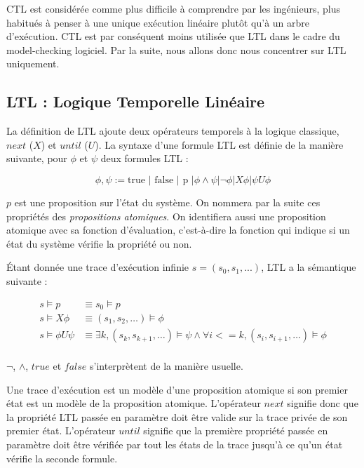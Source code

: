 \ac{CTL} est considérée comme plus difficile à comprendre par les ingénieurs,
plus habitués à penser à une unique exécution linéaire plutôt qu'à un arbre
d'exécution\cite{RCTL_formulas}. \ac{CTL} est par conséquent moins utilisée que
\ac{LTL} dans le cadre du model-checking logiciel. Par la suite, nous allons
donc nous concentrer sur \ac{LTL} uniquement.

\subsection{LTL : Logique Temporelle Linéaire}

La définition de \ac{LTL}\cite{pnueli_LTL} ajoute deux opérateurs temporels à la
logique classique, \(next\) (\(X\)) et \(until\) (\(U\)). La syntaxe d'une
formule \ac{LTL} est définie de la manière suivante, pour \(\phi\) et \(\psi\)
deux formules \ac{LTL} :

\[
\phi, \psi := \text{true }| \text{ false } | \text{ p } |
             \phi \land \psi | \lnot \phi | X \phi | \psi U \phi
\]

\(p\) est une proposition sur l'état du système. On nommera par la suite
ces propriétés des \emph{propositions atomiques}. On identifiera aussi
une proposition atomique avec sa fonction d'évaluation, c'est-à-dire la
fonction qui indique si un état du système vérifie la propriété ou non.

Étant donnée une trace d'exécution infinie \(s = (s_0, s_1, ...)\), \ac{LTL} a
la sémantique suivante :

\[
\begin{aligned}
s \models p & \equiv s_0 \models p \\
s \models X \phi & \equiv (s_1, s_2, \dots) \models \phi \\
s \models \phi U \psi & \equiv \exists k, (s_k, s_{k+1}, \dots) \models \psi
                        \land \forall i <= k, (s_i, s_{i+1}, \dots) \models \phi \\
\end{aligned}
\]

\(\lnot\), \(\land\), \(true\) et \(false\) s'interprètent de la manière
usuelle.

Une trace d'exécution est un modèle d'une proposition atomique si son premier
état est un modèle de la proposition atomique.
L'opérateur \(next\) signifie donc que la propriété \ac{LTL} passée en
paramètre doit être valide sur la trace privée de son premier état.
L'opérateur \(until\) signifie que la première propriété passée en
paramètre doit être vérifiée par tout les états de la trace jusqu'à ce qu'un
état vérifie la seconde formule.


